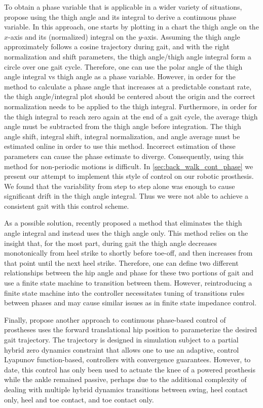To obtain a phase variable that is applicable in a wider variety of situations,
\citet{quintero2016preliminary} propose using the thigh angle and its integral
to derive a continuous phase variable. In this approach, one starts by plotting
in a chart the thigh angle on the $x$-axis and its (normalized) integral on the
$y$-axis. Assuming the thigh angle approximately follows a cosine trajectory
during gait, and with the right normalization and shift parameters, the thigh
angle/thigh angle integral form a circle over one gait cycle. Therefore, one can
use the polar angle of the thigh angle integral vs thigh angle as a phase
variable.  However, in order for the method to calculate a phase angle that
increases at a predictable constant rate, the thigh angle/integral plot should
be centered about the origin and the correct normalization needs to be applied
to the thigh integral.  Furthermore, in order for the thigh integral to reach
zero again at the end of a gait cycle, the average thigh angle must be
subtracted from the thigh angle before integration. The thigh angle shift,
integral shift, integral normalization, and angle average must be estimated
online in order to use this method. Incorrect estimation of these parameters can
cause the phase estimate to diverge. Consequently, using this method for
non-periodic motions is difficult.  In \cref{sec:back_walk_cont_phase} we
present our attempt to implement this style of control on our robotic
prosthesis. We found that the variability from step to step alone was enough to
cause significant drift in the thigh angle integral.  Thus we were not able to
achieve a consistent gait with this control scheme.

As a possible solution, \citet{rezazadeh2018phase} recently proposed a method
that eliminates the thigh angle integral and instead uses the thigh angle only.
This method relies on the insight that, for the most part, during gait the thigh
angle decreases monotonically from heel strike to shortly before toe-off, and
then increases from that point until the next heel strike. Therefore, one can
define two different relationships between the hip angle and phase for these two
portions of gait and use a finite state machine to transition between them.
However, reintroducing a finite state machine into the controller necessitates
tuning of transitions rules between phases and may cause similar issues as in
finite state impedance control.

Finally, \citet{azimi2019model} propose another approach to continuous
phase-based control of prostheses uses the forward translational hip position to
parameterize the desired gait trajectory. The trajectory is designed in
simulation subject to a partial hybrid zero dynamics constraint that allows one
to use an adaptive, control Lyapunov function-based, controllers with convergence
guarantees. However, to date, this control has only been used to actuate the
knee of a powered prosthesis while the ankle remained passive, perhaps due to
the additional complexity of dealing with multiple hybrid dynamics transitions
between swing, heel contact only, heel and toe contact, and toe contact only.

